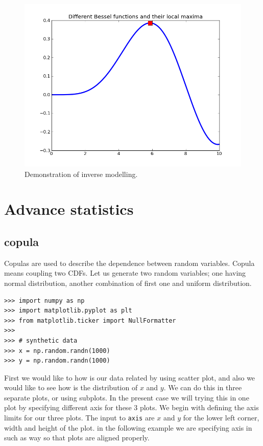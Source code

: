 \documentclass[10pt]{book}
\begin{document}
{\beforefig
\begin{figure}[h!]
  \centering
    \includegraphics[scale=0.5]{images/inverse.png}
  \caption{Demonstration of inverse modelling.}
   \label{fig:inverse}
\end{figure}
\afterfig

\chapter{Advance statistics}

\section{copula}
Copulas are used to describe the dependence between random variables. Copula means coupling two CDFs. Let us generate two random variables; one having normal distribution, another combination of first one and uniform distribution.

\beforeverb \begin{verbatim}
>>> import numpy as np
>>> import matplotlib.pyplot as plt
>>> from matplotlib.ticker import NullFormatter
>>> 
>>> # synthetic data
>>> x = np.random.randn(1000)
>>> y = np.random.randn(1000)
\end{verbatim} \afterverb

First we would like to how is our data related by using scatter plot, and also we would like to see how is the distribution of $x$ and $y$. We can do this in three separate plots, or using subplots. In the present case we will trying this in one plot by specifying different axis for these 3 plots. We begin with defining the axis limits for our three plots. The input to \verb"axis" are $x$ and $y$ for the lower left corner, width and height of the plot. in the following example we are specifying axis in such as way so that plots are aligned properly. 

}
\end{document}
